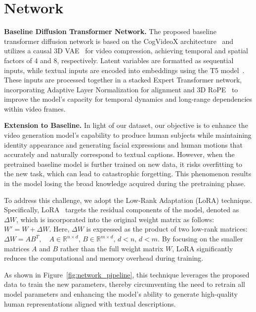 



\section{Network}

\noindent\textbf{Baseline Diffusion Transformer Network.}
The proposed baseline transformer diffusion network is based on the CogVideoX architecture~\cite{yang2024cogvideox} and utilizes a causal 3D VAE~\cite{kingma2022autoencoding} for video compression, achieving temporal and spatial factors of 4 and 8, respectively. Latent variables are formatted as sequential inputs, while textual inputs are encoded into embeddings using the T5 model~\cite{raffel2020exploring}. These inputs are processed together in a stacked Expert Transformer network, incorporating Adaptive Layer Normalization for alignment and 3D RoPE~\cite{su2024roformer} to improve the model's capacity for temporal dynamics and long-range dependencies within video frames.

\noindent\textbf{Extension to Baseline.} 
In light of our dataset, our objective is to enhance the video generation model's capability to produce human subjects while maintaining identity appearance and generating facial expressions and human motions that accurately and naturally correspond to textual captions. However, when the pretrained baseline model is further trained on new data, it risks overfitting to the new task, which can lead to catastrophic forgetting. This phenomenon results in the model losing the broad knowledge acquired during the pretraining phase.

To address this challenge, we adopt the Low-Rank Adaptation (LoRA) technique. 
Specifically, LoRA~\cite{hu2021lora} targets the residual components of the model, denoted as \(\Delta W\), which is incorporated into the original weight matrix as follows:
$W' = W + \Delta W$.
Here, \(\Delta W\) is expressed as the product of two low-rank matrices:
$\Delta W = AB^T, \quad A \in \mathbb{R}^{n \times d}, \, B \in \mathbb{R}^{m \times d}, \, d < n, \, d < m$.
By focusing on the smaller matrices \(A\) and \(B\) rather than the full weight matrix \(W\), LoRA significantly reduces the computational and memory overhead during training. 

As shown in Figure~\ref{fig:network_pipeline}, this technique leverages the proposed data to train the new parameters, thereby circumventing the need to retrain all model parameters and enhancing the model's ability to generate high-quality human representations aligned with textual descriptions.

